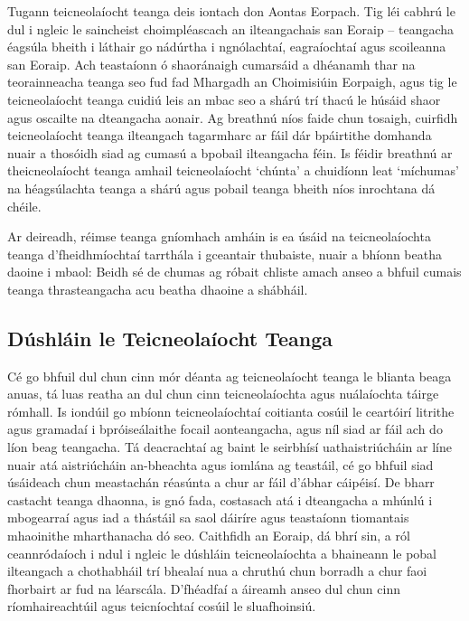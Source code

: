 \documentclass[]{../../metanetpaper}
\begin{document}
\begin{multicols}{2}

Tugann teicneolaíocht teanga deis iontach don Aontas Eorpach. Tig léi cabhrú le dul i ngleic le saincheist choimpléascach an ilteangachais san Eoraip – teangacha éagsúla bheith i láthair go nádúrtha i ngnólachtaí, eagraíochtaí agus scoileanna san Eoraip. Ach teastaíonn ó shaoránaigh cumarsáid a dhéanamh thar na teorainneacha teanga seo fud fad Mhargadh an Choimisiúin Eorpaigh, agus tig le teicneolaíocht teanga cuidiú leis an mbac seo a shárú trí thacú le húsáid shaor agus oscailte na dteangacha aonair. Ag breathnú níos faide chun tosaigh, cuirfidh teicneolaíocht teanga ilteangach tagarmharc ar fáil dár bpáirtithe domhanda nuair a thosóidh siad ag cumasú a bpobail ilteangacha féin. Is féidir breathnú ar theicneolaíocht teanga amhail teicneolaíocht ‘chúnta’ a chuidíonn leat ‘míchumas’ na héagsúlachta teanga a shárú agus pobail teanga bheith níos inrochtana dá chéile.

Ar deireadh, réimse teanga gníomhach amháin is ea úsáid na teicneolaíochta teanga d’fheidhmíochtaí tarrthála i gceantair thubaiste, nuair a bhíonn beatha daoine i mbaol: Beidh sé de chumas ag róbait chliste amach anseo a bhfuil cumais teanga thrasteangacha acu beatha dhaoine a shábháil.

\subsection{Dúshláin le Teicneolaíocht Teanga}

Cé go bhfuil dul chun cinn mór déanta ag teicneolaíocht teanga le blianta beaga anuas, tá luas reatha an dul chun cinn teicneolaíochta agus nuálaíochta táirge rómhall. Is iondúil go mbíonn teicneolaíochtaí coitianta cosúil le ceartóirí litrithe agus gramadaí i bpróiseálaithe focail aonteangacha, agus níl siad ar fáil ach do líon beag teangacha. Tá deacrachtaí ag baint le seirbhísí uathaistriúcháin ar líne nuair atá aistriúcháin an-bheachta agus iomlána ag teastáil, cé go bhfuil siad úsáideach chun meastachán réasúnta a chur ar fáil d’ábhar cáipéisí. De bharr castacht teanga dhaonna, is gnó fada, costasach atá i dteangacha a mhúnlú i mbogearraí agus iad a thástáil sa saol dáiríre agus teastaíonn tiomantais mhaoinithe mharthanacha dó seo. Caithfidh an Eoraip, dá bhrí sin, a ról ceannródaíoch i ndul i ngleic le dúshláin teicneolaíochta a bhaineann le pobal ilteangach a chothabháil trí bhealaí nua a chruthú chun borradh a chur faoi fhorbairt ar fud na léarscála. D’fhéadfaí a áireamh anseo dul chun cinn ríomhaireachtúil agus teicníochtaí cosúil le sluafhoinsiú.


\end{multicols}
\end{document}
